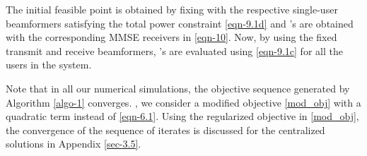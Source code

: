 The initial feasible point  is obtained by fixing  with the respective single-user beamformers satisfying the total power constraint \eqref{eqn-9.1d} and 's are obtained with the corresponding \ac{MMSE} receivers in \eqref{eqn-10}. Now, by using the fixed transmit and receive beamformers, 's are evaluated using \eqref{eqn-9.1c} for all the users in the system. 

Note that in all our numerical simulations, the objective sequence generated by Algorithm \ref{algo-1} converges. , we consider a modified objective \eqref{mod_obj} with a quadratic term instead of \eqref{eqn-6.1}. Using the regularized objective in \eqref{mod_obj}, the convergence of the sequence of iterates is discussed for the centralized solutions in Appendix \ref{sec-3.5}.
